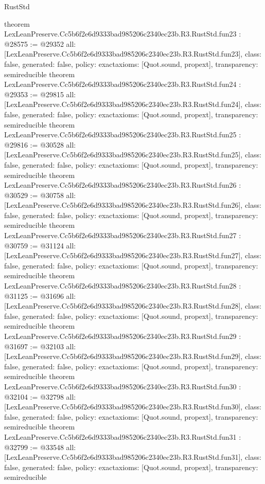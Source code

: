 \begin{lexlean}{RustStd}
\begin{coremodule}
{}
theorem LexLeanPreserve.Cc5b6f2e6d9333bad985206c2340ec23b.R3.RustStd.fun23 : @28575 := @29352 {
  all: [LexLeanPreserve.Cc5b6f2e6d9333bad985206c2340ec23b.R3.RustStd.fun23],
  class: false,
  generated: false,
  policy: exact{axioms: [Quot.sound, propext]},
  transparency: semireducible
}
theorem LexLeanPreserve.Cc5b6f2e6d9333bad985206c2340ec23b.R3.RustStd.fun24 : @29353 := @29815 {
  all: [LexLeanPreserve.Cc5b6f2e6d9333bad985206c2340ec23b.R3.RustStd.fun24],
  class: false,
  generated: false,
  policy: exact{axioms: [Quot.sound, propext]},
  transparency: semireducible
}
theorem LexLeanPreserve.Cc5b6f2e6d9333bad985206c2340ec23b.R3.RustStd.fun25 : @29816 := @30528 {
  all: [LexLeanPreserve.Cc5b6f2e6d9333bad985206c2340ec23b.R3.RustStd.fun25],
  class: false,
  generated: false,
  policy: exact{axioms: [Quot.sound, propext]},
  transparency: semireducible
}
theorem LexLeanPreserve.Cc5b6f2e6d9333bad985206c2340ec23b.R3.RustStd.fun26 : @30529 := @30758 {
  all: [LexLeanPreserve.Cc5b6f2e6d9333bad985206c2340ec23b.R3.RustStd.fun26],
  class: false,
  generated: false,
  policy: exact{axioms: [Quot.sound, propext]},
  transparency: semireducible
}
theorem LexLeanPreserve.Cc5b6f2e6d9333bad985206c2340ec23b.R3.RustStd.fun27 : @30759 := @31124 {
  all: [LexLeanPreserve.Cc5b6f2e6d9333bad985206c2340ec23b.R3.RustStd.fun27],
  class: false,
  generated: false,
  policy: exact{axioms: [Quot.sound, propext]},
  transparency: semireducible
}
theorem LexLeanPreserve.Cc5b6f2e6d9333bad985206c2340ec23b.R3.RustStd.fun28 : @31125 := @31696 {
  all: [LexLeanPreserve.Cc5b6f2e6d9333bad985206c2340ec23b.R3.RustStd.fun28],
  class: false,
  generated: false,
  policy: exact{axioms: [Quot.sound, propext]},
  transparency: semireducible
}
theorem LexLeanPreserve.Cc5b6f2e6d9333bad985206c2340ec23b.R3.RustStd.fun29 : @31697 := @32103 {
  all: [LexLeanPreserve.Cc5b6f2e6d9333bad985206c2340ec23b.R3.RustStd.fun29],
  class: false,
  generated: false,
  policy: exact{axioms: [Quot.sound, propext]},
  transparency: semireducible
}
theorem LexLeanPreserve.Cc5b6f2e6d9333bad985206c2340ec23b.R3.RustStd.fun30 : @32104 := @32798 {
  all: [LexLeanPreserve.Cc5b6f2e6d9333bad985206c2340ec23b.R3.RustStd.fun30],
  class: false,
  generated: false,
  policy: exact{axioms: [Quot.sound, propext]},
  transparency: semireducible
}
theorem LexLeanPreserve.Cc5b6f2e6d9333bad985206c2340ec23b.R3.RustStd.fun31 : @32799 := @33548 {
  all: [LexLeanPreserve.Cc5b6f2e6d9333bad985206c2340ec23b.R3.RustStd.fun31],
  class: false,
  generated: false,
  policy: exact{axioms: [Quot.sound, propext]},
  transparency: semireducible
}
\end{coremodule}
\end{lexlean}
